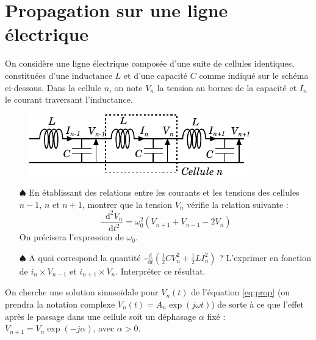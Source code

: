 \documentclass{report}
\newcommand*\dif{\mathop{}\!\mathrm{d}}
\begin{document}
\newpage

\section*{Propagation sur une ligne électrique}

On considère une ligne électrique composée d'une suite de cellules identiques, constituées d'une inductance $L$ et d'une capacité $C$ comme indiqué sur le schéma ci-dessous. Dans la cellule $n$, on note $V_n$ la tension au bornes de la capacité et $I_n$ le courant traversant l'inductance.

\begin{figure}[h!]
\centering
	\includegraphics[scale=1.5]{onde3.pdf}
\end{figure}

\begin{itemize}

	\item[$\spadesuit$] En établissant des relations entre les courants et les tensions des cellules $n-1$, $n$ et $n+1$, montrer que la tension $V_n$ vérifie la relation suivante :
	\begin{equation}
		\frac{\dif^2 V_n}{\dif t^2} =\omega_0^2(V_{n+1}+V_{n-1}-2V_n)
		\label{eq:prop}
	\end{equation}
	On précisera l'expression de $\omega_0$.
	
	 \item[$\spadesuit$] A quoi correspond la quantité $\frac{\dif}{\dif t}\left( \frac{1}{2}CV_n^2 + \frac{1}{2}LI_n^2 \right)$ ? L'exprimer en fonction de $i_n\times V_{n-1}$ et $i_{n+1}\times V_{n}$. Interpréter ce résultat.

\end{itemize}

On cherche une solution sinusoïdale pour $V_n(t)$ de l'équation \ref{eq:prop} (on prendra la notation complexe $V_n(t)=A_n\exp(j\omega t)$) de sorte à ce que l'effet après le passage dans une cellule soit un déphasage $\alpha$ fixé : $V_{n+1}=V_n\exp(-j\alpha)$, avec $\alpha>0$.
\end{document}
